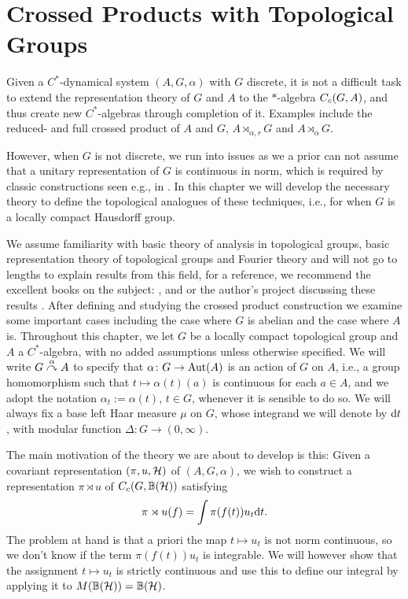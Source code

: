 \chapter{Crossed Products with Topological Groups}
Given a $C^*$-dynamical system $(A,G,\alpha)$ with $G$ discrete, it is not a difficult task to extend the representation theory of $G$ and $A$ to the $*$-algebra $C_c(G,A)$, and thus create new $C^*$-algebras through completion of it. Examples include the reduced- and full crossed product of $A$ and $G$, $A \rtimes_{\alpha,r} G$ and $A \rtimes_{\alpha} G$.

However, when $G$ is not discrete, we run into issues as we a prior can not assume that a unitary representation of $G$ is continuous in norm, which is required by classic constructions seen e.g., in \cite{brown2008c}. In this chapter we will develop the necessary theory to define the topological analogues of these techniques, i.e., for when $G$ is a locally compact Hausdorff group.

We assume familiarity with basic theory of analysis in topological groups, basic representation theory of topological groups and Fourier theory and will not go to lengths to explain results from this field, for a reference, we recommend the excellent books on the subject: \cite{folland2016fourier}, \cite{berg1984harmonic} and \cite{folland2013real} or the author's project discussing these results \cite{fourierproj}. After defining and studying the crossed product construction we examine some important cases including the case where $G$ is abelian and the case where $A$ is.
Throughout this chapter, we let $G$ be a locally compact topological group and $A$ a $C^*$-algebra, with no added assumptions unless otherwise specified. We will write $G \stackrel{\alpha}{\curvearrowright} A$ to specify that $\alpha \colon G \to \operatorname{Aut}(A)$ is an action of $G$ on $A$, i.e., a group homomorphism such that $t \mapsto \alpha(t)(a)$ is continuous for each $a \in A$, and we adopt the notation $\alpha_t := \alpha(t)$, $t \in G$, whenever it is sensible to do so. We will always fix a base left Haar measure $\mu$ on $G$, whose integrand we will denote by $\mathrm{d} t$, with modular function $\Delta \colon G \to (0,\infty)$. 

The main motivation of the theory we are about to develop is this: Given a covariant representation $(\pi,u,\mathcal{H})$ of $(A,G,\alpha)$, we wish to construct a representation $\pi \rtimes u$ of $C_c(G,\mathbb{B}(\mathcal{H}))$ satisfying 
\begin{align*}
\pi \rtimes u (f) = \int \pi(f(t))u_t \mathrm{d} t.
\end{align*}
The problem at hand is that a priori the map $t \mapsto u_t$ is not norm continuous, so we don't know if the term $\pi(f(t))u_t$ is integrable. We will however show that the assignment $t \mapsto u_t$ is strictly continuous and use this to define our integral by applying it to $M(\mathbb{B}(\mathcal{H})) = \mathbb{B}(\mathcal{H})$. 

